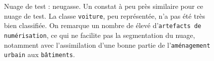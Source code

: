 \documentclass[a4paper, onecolumn, 11pt]{article}
\begin{document}
\begin{figure}[h]
    \qquad
    \caption{Nuage de test : neugasse. Un constat à peu près similaire pour ce nuage de test. La classe \texttt{voiture}, peu représentée, n'a pas été très bien classifiée. On remarque un nombre de élevé d'\texttt{artefacts de numérisation}, ce qui ne facilite pas la segmentation du nuage, notamment avec l'assimilation d'une bonne partie de l'\texttt{aménagement urbain} aux \texttt{bâtiments}.}
    \label{fig:neugasse}
\end{figure}
\end{document}
